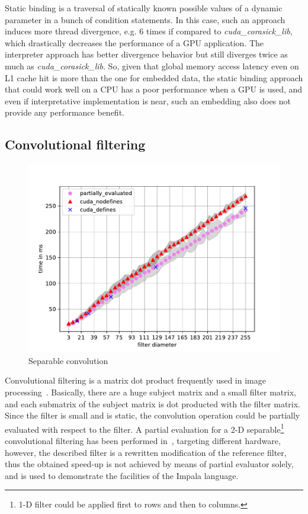 Static binding is a traversal of statically known possible values of a dynamic parameter in a bunch of condition statements. In this case, such an approach induces more thread divergence, e.g. 6 times if compared to \emph{cuda\_corasick\_lib}, which drastically decreases the performance of a GPU application. The interpreter approach has better divergence behavior but still diverges twice as much as \emph{cuda\_corasick\_lib}. So, given that global memory access latency even on L1 cache hit is more than the one for embedded data, the static binding approach that could work well on a CPU has a poor performance when a GPU is used, and even if interpretative implementation is near, such an embedding also does not provide any performance benefit.


\subsection{Convolutional filtering}

\begin{figure}[h!]
    \centering
    \includegraphics{figures/separable_convolution_diploma.pdf}
    \caption{Separable convolution}
    \label{fig:convolution}
\end{figure}
Convolutional filtering is a matrix dot product frequently used in image processing~\cite{chetlur2014cudnn}. Basically, there are a huge subject matrix and a small filter matrix, and each submatrix of the subject matrix is dot producted with the filter matrix.
Since the filter is small and is static, the convolution operation could be partially evaluated with respect to the filter.
A partial evaluation for a 2-D separable\footnote{1-D filter could be applied first to rows and then to columns.} convolutional filtering has been performed in~\cite{OnlinePe}, targeting different hardware, however, the described filter is a rewritten modification of the reference filter, thus the obtained speed-up is not achieved by means of partial evaluator solely, and is used to demonstrate the facilities of the Impala language.

